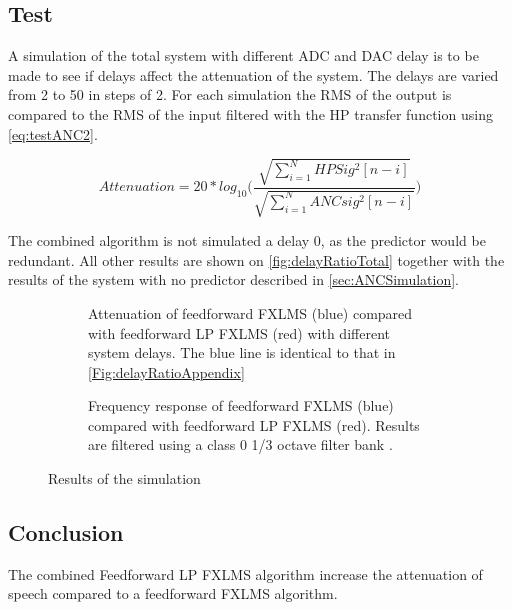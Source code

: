 \subsection{Test}
A simulation of the total system with different ADC and DAC delay is to be made to see if delays affect the attenuation of the system. The delays are varied from 2 to 50 in steps of 2. For each simulation the RMS of the output is compared to the RMS of the input filtered with the HP transfer function using \autoref{eq:testANC2}. 

\begin{equation}\label{eq:testANC2}
	Attenuation=20*log_{10}\bigg(\frac{\sqrt{\sum\limits_{i=1}^{N}HPSig^2[n-i]}}{\sqrt{\sum\limits_{i=1}^{N}ANCsig^2[n-i]}}\bigg)
\end{equation}

The combined algorithm is not simulated a delay 0, as the predictor would be redundant. All other results are shown on \autoref{fig:delayRatioTotal} together with the results of the system with no predictor described in \autoref{sec:ANCSimulation}.
\begin{figure}[H]
	\centering
		\hspace{-20mm}
	\begin{subfigure}[b]{0.40\textwidth}
	\centering
		
		\caption{ Attenuation of feedforward FXLMS (blue) compared with feedforward LP FXLMS (red) with different system delays. The blue line is identical to that in \autoref{Fig:delayRatioAppendix}}
		\label{fig:delayRatioTotal}
	\end{subfigure}
	\hspace{20mm}
	\begin{subfigure}[b]{0.40\textwidth}
	\centering
	
	\caption{Frequency response of feedforward FXLMS (blue) compared with feedforward LP FXLMS (red). Results are filtered using a class 0 1/3 octave filter bank \cite{OctaveBand}.}
	\label{fig:ANCcompareALLAppendix}
	\end{subfigure}	
	\caption{Results of the simulation}	
\end{figure}



\subsection{Conclusion}
The combined Feedforward LP FXLMS algorithm increase the attenuation of speech compared to a feedforward FXLMS algorithm. 
